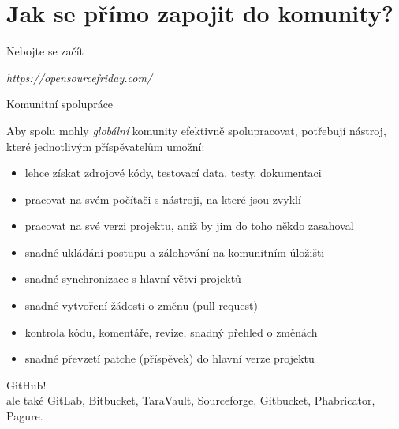 \documentclass[11pt]{beamer}
\begin{document}
\section{Jak se přímo zapojit do komunity?}

\begin{frame}{Nebojte se začít}
	\begin{center}
		\textit{{\tiny https://opensourcefriday.com/}}
	\end{center}
\end{frame}


\begin{frame}{Komunitní spolupráce}
	
	Aby spolu mohly \textit{globální} komunity efektivně spolupracovat, potřebují nástroj, které jednotlivým příspěvatelům umožní:
	
	\begin{itemize}
		\item lehce získat zdrojové kódy, testovací data, testy, dokumentaci
		\item pracovat na svém počítači s nástroji, na které jsou zvyklí
		\item pracovat na své verzi projektu, aniž by jim do toho někdo zasahoval
		\item snadné ukládání postupu a zálohování na komunitním úložišti
		\item snadné synchronizace s hlavní větví projektů
		\item snadné vytvoření žádosti o změnu (pull request)
		\item kontrola kódu, komentáře, revize, snadný přehled o změnách
		\item snadné převzetí patche (příspěvek) do hlavní verze projektu
	\end{itemize}
\end{frame}

\begin{frame}
	\begin{center}
		{\Huge GitHub!} \\
		\vspace{2cm}
		ale také GitLab, Bitbucket, TaraVault, Sourceforge, Gitbucket, Phabricator, Pagure.
		
	\end{center}
\end{frame}
\end{document}
